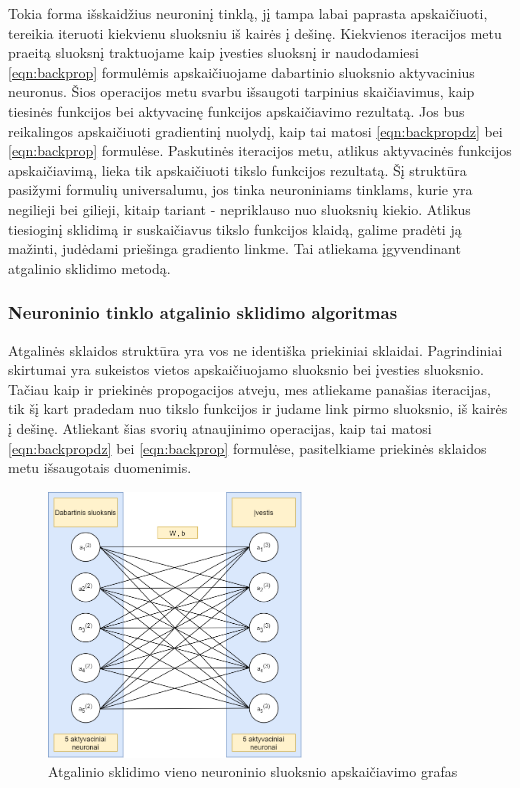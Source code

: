 \documentclass[a4paper, 12pt]{article}
\begin{document}
Tokia forma išskaidžius neuroninį tinklą, jį tampa labai paprasta apskaičiuoti, tereikia iteruoti kiekvienu sluoksniu iš kairės į dešinę. Kiekvienos iteracijos metu praeitą sluoksnį traktuojame kaip įvesties sluoksnį ir naudodamiesi \ref{eqn:backprop} formulėmis apskaičiuojame dabartinio sluoksnio aktyvacinius neuronus. Šios operacijos metu svarbu išsaugoti tarpinius skaičiavimus, kaip tiesinės funkcijos bei aktyvacinę funkcijos apskaičiavimo rezultatą. Jos bus reikalingos apskaičiuoti gradientinį nuolydį, kaip tai matosi \ref{eqn:backpropdz} bei \ref{eqn:backprop} formulėse. Paskutinės iteracijos metu, atlikus aktyvacinės funkcijos apskaičiavimą, lieka tik apskaičiuoti tikslo funkcijos rezultatą. 
Šį struktūra pasižymi formulių universalumu, jos tinka neuroniniams tinklams, kurie yra negilieji bei gilieji, kitaip tariant - nepriklauso nuo sluoksnių kiekio. Atlikus tiesioginį sklidimą ir suskaičiavus tikslo funkcijos klaidą, galime pradėti ją mažinti, judėdami priešinga gradiento linkme. Tai atliekama įgyvendinant atgalinio sklidimo metodą.
	

%
\subsubsection{Neuroninio tinklo atgalinio sklidimo algoritmas}
%

Atgalinės sklaidos struktūra yra vos ne identiška priekiniai sklaidai. Pagrindiniai skirtumai yra sukeistos vietos apskaičiuojamo sluoksnio bei įvesties sluoksnio. Tačiau kaip ir priekinės propogacijos atveju, mes atliekame panašias iteracijas, tik šį kart pradedam nuo tikslo funkcijos ir judame link pirmo sluoksnio, iš kairės į dešinę. Atliekant šias svorių atnaujinimo operacijas, kaip tai matosi \ref{eqn:backpropdz} bei \ref{eqn:backprop} formulėse, pasitelkiame priekinės sklaidos metu išsaugotais duomenimis. 

\begin{figure}[h]
\centering
\includegraphics[width=0.6\textwidth]{BackProp neuronais}
\caption{Atgalinio sklidimo vieno neuroninio sluoksnio apskaičiavimo grafas}
\label{BackProp neuronais}
\end{figure}
\end{document}
